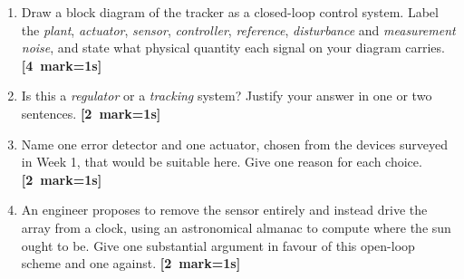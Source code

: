 \documentclass[11pt,a4paper]{article}
\newcommand{\qmarks}[1]{\hfill\mbox{\small\color{fnavy}\textbf{[#1 mark\ifnum#1=1\else s\fi]}}}
\begin{document}
\begin{enumerate}[label=(\alph*)]
\item Draw a block diagram of the tracker as a closed-loop control system.
      Label the \emph{plant}, \emph{actuator}, \emph{sensor}, \emph{controller},
      \emph{reference}, \emph{disturbance} and \emph{measurement noise}, and
      state what physical quantity each signal on your diagram carries.
      \qmarks{4}

\item Is this a \emph{regulator} or a \emph{tracking} system? Justify your
      answer in one or two sentences. \qmarks{2}

\item Name one error detector and one actuator, chosen from the devices
      surveyed in Week 1, that would be suitable here. Give one reason for each
      choice. \qmarks{2}

\item An engineer proposes to remove the sensor entirely and instead drive the
      array from a clock, using an astronomical almanac to compute where the
      sun ought to be. Give one substantial argument in favour of this
      open-loop scheme and one against. \qmarks{2}
\end{enumerate}
\end{document}
